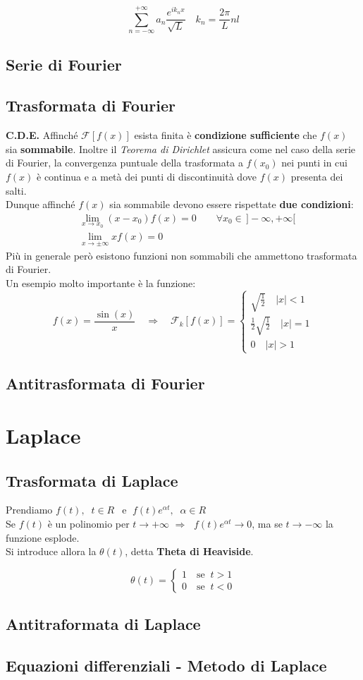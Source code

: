 \documentclass[x11names]{article}
\begin{document}
\[
	\sum_{n=-\infty}^{+\infty} a_n \frac{e^{ik_{n}x}}{\sqrt{L}} \quad k_n = \frac{2\pi}{L}nl
\]

\subsection{Serie di Fourier}
\subsection{Trasformata di Fourier}
\textbf{C.D.E.} Affinché $\mathscr{F}[f(x)]$ esista finita è \textbf{condizione sufficiente} che $f(x)$ sia \textbf{sommabile}. Inoltre il \textit{Teorema di Dirichlet} assicura come nel caso della serie di Fourier, la convergenza puntuale della trasformata a $f(x_0)$ nei punti in cui $f(x)$ è continua e a metà dei punti di discontinuità dove $f(x)$ presenta dei salti.\\
Dunque affinché $f(x)$ sia sommabile devono essere rispettate \textbf{due condizioni}:
\begin{align}
	&\lim_{x \to x_0}(x-x_0)f(x) = 0 \quad\quad \forall x_0 \in \, ]-\infty,+\infty[ \\
	&\lim_{x \to \pm\infty}xf(x) =  0
\end{align}
Più in generale però esistono funzioni non sommabili che ammettono trasformata di Fourier. \\Un esempio molto importante è la funzione:
\[
	f(x)=\frac{\sin(x)}{x} \quad\Longrightarrow\quad \mathscr{F}_{k}[f(x)] = \begin{cases}
		\sqrt{\frac{1}{2}}\quad |x|<1 \\
		\frac{1}{2}\sqrt{\frac{1}{2}}\quad |x|=1 \\
		0 \quad |x|>1 
	\end{cases} 
\] 


\subsection{Antitrasformata di Fourier}

\section{Laplace}
\subsection{Trasformata di Laplace}
Prendiamo $f(t), \;\; t\in R\;\,$ e $\;f(t)e^{\alpha t},\;\; \alpha \in R$ \\
Se $f(t)$ è un polinomio per $t \to +\infty$ $\Longrightarrow$ $\;f(t)e^{\alpha t} \to 0$, ma se $t \to -\infty$ la funzione esplode.\\Si introduce allora la $\theta(t)$, detta \textbf{Theta di Heaviside}. 

\[
	\theta(t) = \begin{cases}
		1 \quad\text{se}\;\;  t >1 \\
		0 \quad\text{se}\;\;  t <0
	\end{cases}
\]
\subsection{Antitraformata di Laplace}
\subsection{Equazioni differenziali - Metodo di Laplace}
\end{document}
